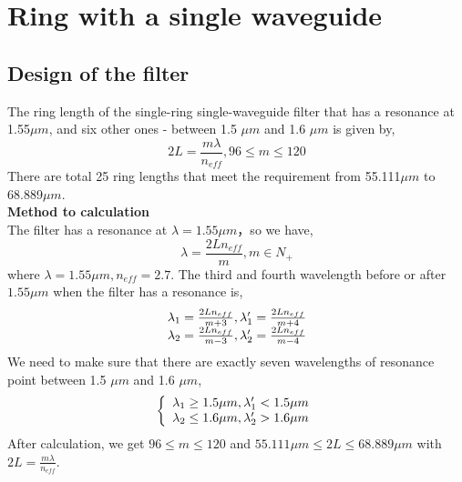 \documentclass[fontsize=11pt]{scrartcl}
\begin{document}
\section{Ring with a single waveguide}
\subsection{Design of the filter}
The ring length of the single-ring single-waveguide filter that has a resonance at
1.55$\mu m$, and six other ones - between 1.5 $\mu m$ and 1.6 $\mu m$ is given by,\\
\begin{equation}
    2L=\frac{m\lambda}{n_{eff}}, 96\leq m\leq 120
    \label{2L_1}
\end{equation}
There are total 25 ring lengths that meet the requirement from 55.111$\mu m$ to 68.889$\mu m$. \\
\textbf{Method to calculation}\\
The filter has a resonance at $\lambda=1.55\mu m $，so we have,\\
\begin{equation}
    \lambda=\frac{2Ln_{eff}} m , m\in N_+  
\end{equation}
where $\lambda=1.55\mu m,n_{eff}=2.7$.
The third and fourth wavelength before or after $1.55\mu m$ when the filter has a resonance is,
\begin{equation}
    \begin{array}[]{lr}
    \lambda_1=\frac{2Ln_{eff}}{m+3},\lambda_1'=\frac{2Ln_{eff}}{m+4} \\
    \lambda_2=\frac{2Ln_{eff}}{m-3},\lambda_2'=\frac{2Ln_{eff}}{m-4}
    \end{array}
\end{equation}
We need to make sure that there are exactly seven wavelengths of resonance point between 1.5 $\mu m$ and 1.6 $\mu m$,
\begin{equation}
    \left\{ 
        \begin{array}[]{lr}
             \lambda_1 \geq 1.5 \mu m, \lambda_1'<1.5\mu m\\
             \lambda_2 \leq 1.6 \mu m, \lambda_2'>1.6\mu m 
        \end{array}
   \right.
\end{equation}
After calculation, we get $96\leq m\leq 120$ and $55.111\mu m\leq 2L\leq 68.889\mu m$ with $2L=\frac{m\lambda}{n_{eff}}$.
\end{document}
